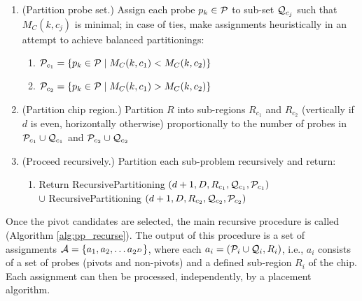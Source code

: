 \begin{algorithm}[t!]
\begin{minipage}{\textwidth}
{\begin{enumerate}
      each pivot candidate $q_k \in \CalQ$ to sub-set $\CalQ_{c_j}$ associated
      with pivot $q_{c_j}$ such that $C(k,c_j)$ is minimal; in case of ties,
      make assignments heuristically in an attempt to achieve balanced
      partitionings:
  \begin{enumerate}
    \item $\CalQ_{c_1} = \{q_k \in \CalQ \;|\; C(k,c_1) < C(k,c_2)\}$
    \item $\CalQ_{c_2} = \{q_k \in \CalQ \;|\; C(k,c_1) > C(k,c_2)\}$
  \end{enumerate}
\item \label{step:pp_part_probes} (Partition probe set.) Assign each probe
      $p_k \in {\mathcal{P}}$ to sub-set $\CalQ_{c_j}$ such that $M_C(k,c_j)$ is
      minimal; in case of ties, make assignments heuristically in an attempt to
      achieve balanced partitionings:
  \begin{enumerate}
    \item ${\mathcal{P}}_{c_1} = \{p_k \in {\mathcal{P}} \;|\; M_C(k,c_1) < M_C(k,c_2)\}$
    \item ${\mathcal{P}}_{c_2} = \{p_k \in {\mathcal{P}} \;|\; M_C(k,c_1) > M_C(k,c_2)\}$
  \end{enumerate}
\item \label{step:pp_part_r} (Partition chip region.) Partition $R$ into
      sub-regions $R_{c_1}$ and $R_{c_2}$ (vertically if $d$ is even,
      horizontally otherwise) proportionally to the number of probes in
      ${\mathcal{P}}_{c_1} \cup {\mathcal{Q}}_{c_1}$ and ${\mathcal{P}}_{c_2} \cup {\mathcal{Q}}_{c_2}$
\item (Proceed recursively.) Partition each sub-problem recursively and return:
  \begin{enumerate}
    \item Return RecursivePartitioning $(d + 1, D, R_{c_1}, {\mathcal{Q}}_{c_1},
    {\mathcal{P}}_{c_1})$ \\ $\cup$ RecursivePartitioning $(d + 1, D, R_{c_2},
    {\mathcal{Q}}_{c_2}, {\mathcal{P}}_{c_2})$
  \end{enumerate}
\end{enumerate}
}\end{minipage}
\end{algorithm}

Once the pivot candidates are selected, the main recursive procedure is called
(Algorithm \ref{alg:pp_recurse}). The output of this procedure is a set of
assignments ${\mathcal{A}} = \{a_1, a_2, \dots a_{2^D}\}$, where each
$a_i = ({\mathcal{P}}_i \cup {\mathcal{Q}}_i, R_i)$, i.e., $a_i$ consists of a set of probes
(pivots and non-pivots) and a defined sub-region $R_i$ of the chip. Each
assignment can then be processed, independently, by a placement algorithm.


